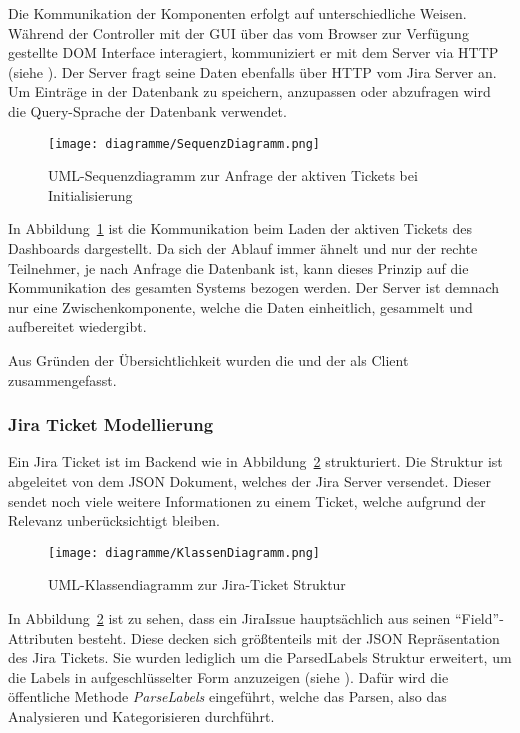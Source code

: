 Die Kommunikation der Komponenten erfolgt auf unterschiedliche Weisen. Während 
der Controller mit der GUI über das vom Browser zur Verfügung gestellte \gls{DOM}
Interface interagiert, kommuniziert er mit dem Server via \gls{HTTP} (siehe ).
Der Server fragt seine Daten ebenfalls über HTTP vom \gls{Jira} Server an. Um Einträge
in der Datenbank zu speichern, anzupassen oder abzufragen wird die Query-Sprache
der Datenbank verwendet.

\begin{figure}[H]
    \texttt{[image: diagramme/SequenzDiagramm.png]}
    \caption{UML-Sequenzdiagramm zur Anfrage der aktiven Tickets bei Initialisierung}\label{fig:sequenz}
\end{figure}

In Abbildung~\ref{fig:sequenz} ist die Kommunikation beim Laden der aktiven Tickets des Dashboards 
dargestellt. Da sich der Ablauf immer ähnelt und nur der rechte Teilnehmer, je nach 
Anfrage die Datenbank ist, kann dieses Prinzip auf die Kommunikation des gesamten
Systems bezogen werden. Der Server ist demnach nur eine Zwischenkomponente, welche die
Daten einheitlich, gesammelt und aufbereitet wiedergibt.

Aus Gründen der Übersichtlichkeit wurden die 
und der  als Client zusammengefasst.\\

\subsubsection{\gls{Jira} Ticket Modellierung}
Ein Jira Ticket ist im Backend wie in Abbildung~\ref{fig:classes} strukturiert. Die Struktur ist abgeleitet 
von dem \gls{JSON} Dokument, welches der \gls{Jira} Server versendet. Dieser
sendet noch viele weitere Informationen zu einem Ticket, welche aufgrund der Relevanz
unberücksichtigt bleiben.

\begin{figure}[H]
    \texttt{[image: diagramme/KlassenDiagramm.png]}
    \caption{UML-Klassendiagramm zur Jira-Ticket Struktur}\label{fig:classes}
\end{figure}

In Abbildung~\ref{fig:classes} ist zu sehen, dass ein JiraIssue hauptsächlich aus 
seinen ``Field''-Attributen besteht. Diese decken sich größtenteils mit der 
\gls{JSON} Repräsentation des \gls{Jira} Tickets. Sie wurden lediglich um die ParsedLabels Struktur 
erweitert, um die Labels in aufgeschlüsselter Form anzuzeigen (siehe ).
Dafür wird die öffentliche Methode \textit{ParseLabels} eingeführt, welche das Parsen, also das
Analysieren und Kategorisieren durchführt. 

